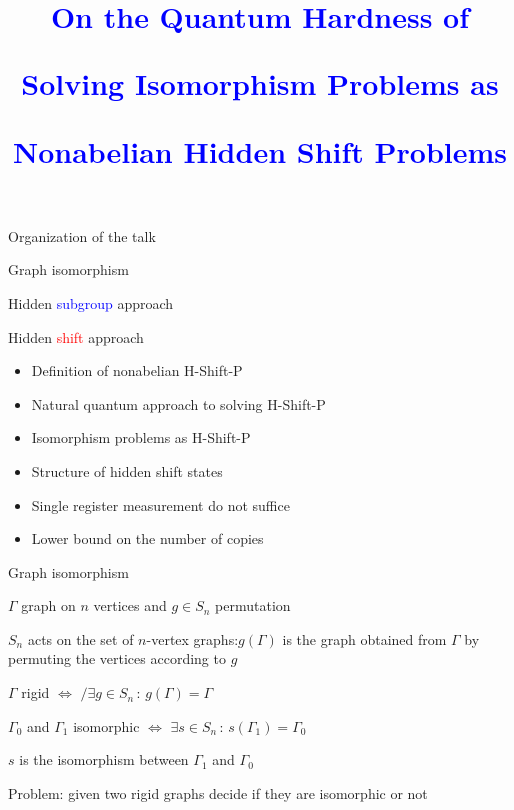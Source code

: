 \documentclass[final,slideColor,nototal,colorBG,pdf,simple]{prosper}
\title{
\vskip -15pt
\textcolor{blue}{On the Quantum Hardness of}

\medskip 
\textcolor{blue}{Solving Isomorphism Problems as}

\medskip 
\textcolor{blue}{Nonabelian Hidden Shift Problems}}
\author{

\bigskip

\bigskip
\fontText{\textcolor{green}{Pawel Wocjan}}

\bigskip

\fontText{joint work with Andrew Childs}

\medskip 
\fontText{arXiv:quant-ph/0510185}}
\newcommand{\bs}{\begin{slide}}
\newcommand{\es}{\end{slide}}
\newcommand{\<}{\langle}
\renewcommand{\>}{\rangle}
\begin{document}
\maketitle


\bs{Organization of the talk}

Graph isomorphism

\bigskip
Hidden \textcolor{blue}{subgroup} approach

\bigskip
Hidden \textcolor{red}{shift} approach
\medskip
\begin{itemize}
\item Definition of nonabelian H-Shift-P

\medskip
\item Natural quantum approach to solving H-Shift-P

\medskip
\item Isomorphism problems as H-Shift-P

\bigskip
\item Structure of hidden shift states

\medskip
\item Single register measurement do not suffice 

\medskip
\item Lower bound on the number of copies
\end{itemize}


\es


\bs{Graph isomorphism}

$\Gamma$ graph on $n$ vertices and $g\in S_n$ permutation

\bigskip

$S_n$ acts on the set of $n$-vertex graphs:\quad $g(\Gamma)$ is the
graph obtained from $\Gamma$ by permuting the vertices according to
$g$

\bigskip
$\Gamma$ rigid $\Leftrightarrow$ $/\!\!\!\exists g\in S_n \, : \,
g(\Gamma)=\Gamma$

\bigskip
$\Gamma_0$ and $\Gamma_1$ isomorphic $\Leftrightarrow$ $\exists
s\in S_n\,:\, s(\Gamma_1)=\Gamma_0$

\medskip 
$s$ is the isomorphism between $\Gamma_1$ and $\Gamma_0$

\bigskip

\bigskip
Problem: given two rigid graphs decide if they are isomorphic or not
\es
\end{document}
